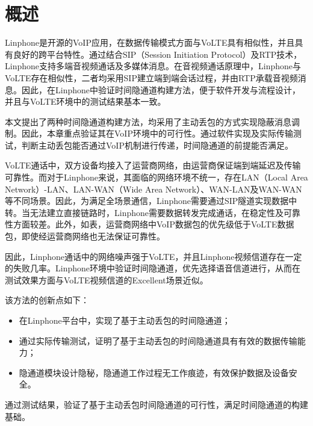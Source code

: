 \section{概述}
\label{chap:linphone:overview}

Linphone是开源的VoIP应用，在数据传输模式方面与VoLTE具有相似性，并且具有良好的跨平台特性。通过结合SIP（Session Initiation Protocol）及RTP技术，Linphone支持多端音视频通话及多媒体消息。在音视频通话原理中，Linphone与VoLTE存在相似性，二者均采用SIP建立端到端会话过程，并由RTP承载音视频消息。因此，在Linphone中验证时间隐通道构建方法，便于软件开发与流程设计，并且与VoLTE环境中的测试结果基本一致。

本文提出了两种时间隐通道构建方法，均采用了主动丢包的方式实现隐蔽消息调制。因此，本章重点验证其在VoIP环境中的可行性。通过软件实现及实际传输测试，判断主动丢包能否通过VoIP机制进行传递，时间隐通道的前提能否满足。

VoLTE通话中，双方设备均接入了运营商网络，由运营商保证端到端延迟及传输可靠性。而对于Linphone来说，其面临的网络环境不统一，存在LAN（Local Area Network）-LAN、LAN-WAN（Wide Area Network）、WAN-LAN及WAN-WAN等不同场景。因此，为满足全场景通信，Linphone需要通过SIP隧道实现数据中转。当无法建立直接链路时，Linphone需要数据转发完成通话，在稳定性及可靠性方面较差。此外，如表，运营商网络中VoIP数据包的优先级低于VoLTE数据包，即使经运营商网络也无法保证可靠性。

因此，Linphone通话中的网络噪声强于VoLTE，并且Linphone视频信道存在一定的失败几率。Linphone环境中验证时间隐通道，优先选择语音信道进行，从而在测试效果方面与VoLTE视频信道的Excellent场景近似。

该方法的创新点如下：
\begin{itemize}
	\item 在Linphone平台中，实现了基于主动丢包的时间隐通道；
	\item 通过实际传输测试，证明了基于主动丢包的时间隐通道具有有效的数据传输能力；
	\item 隐通道模块设计隐秘，隐通道工作过程无工作痕迹，有效保护数据及设备安全。
\end{itemize}

通过测试结果，验证了基于主动丢包时间隐通道的可行性，满足时间隐通道的构建基础。